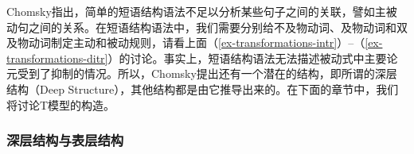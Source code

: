 Chomsky指出，简单的短语结构语法不足以分析某些句子之间的关联，譬如主被动句之间的关系。在短语结构语法中，我们需要分别给不及物动词、及物动词和双及物动词制定主动和被动规则，请看上面（\ref{ex-transformations-intr}）--（\ref{ex-transformations-ditr}）的讨论。事实上，短语结构语法无法描述被动式中主要论元受到了抑制的情况。所以，Chomsky提出还有一个潜在的结构，即所谓的深层结构（Deep Structure），其他结构都是由它推导出来的。在下面的章节中，我们将讨论T模型的构造。

\subsubsection{深层结构与表层结构}

